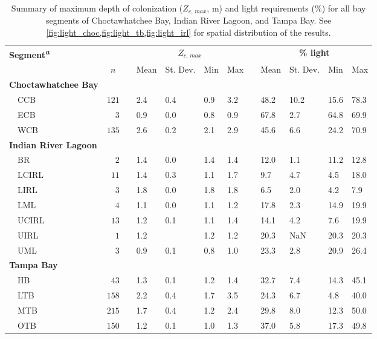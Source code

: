 \documentclass[letterpaper,12pt,oneside]{article}\usepackage[]{graphicx}\usepackage[]{color}
\begin{document}
\begin{table}[!tbp]
{\small
\caption{Summary of maximum depth of colonization ($Z_{c,\,max}$, m) and light requirements (\%) for all bay segments of Choctawhatchee Bay, Indian River Lagoon, and Tampa Bay.  See \cref{fig:light_choc,fig:light_tb,fig:light_irl} for spatial distribution of the results.\label{tab:light_summ}} 
\begin{center}
\begin{tabular}{lrcllllcllll}
\hline\hline
\multicolumn{1}{l}{\bfseries Segment\textsuperscript{\textit{a}}}&\multicolumn{1}{c}{\bfseries }&\multicolumn{1}{c}{\bfseries }&\multicolumn{4}{c}{\bfseries {\bf $Z_{c,\,max}$}}&\multicolumn{1}{c}{\bfseries }&\multicolumn{4}{c}{\bfseries \% light}\tabularnewline
\cline{4-7} \cline{9-12}
\multicolumn{1}{l}{}&\multicolumn{1}{c}{$n$}&\multicolumn{1}{c}{}&\multicolumn{1}{c}{Mean}&\multicolumn{1}{c}{St. Dev.}&\multicolumn{1}{c}{Min}&\multicolumn{1}{c}{Max}&\multicolumn{1}{c}{}&\multicolumn{1}{c}{Mean}&\multicolumn{1}{c}{St. Dev.}&\multicolumn{1}{c}{Min}&\multicolumn{1}{c}{Max}\tabularnewline
\hline
{\bfseries Choctawhatchee Bay}&&&&&&&&&&&\tabularnewline
~~CCB&$121$&&2.4&0.4&0.9&3.2&&48.2&10.2&15.6&78.3\tabularnewline
~~ECB&$  3$&&0.9&0.0&0.8&0.9&&67.8& 2.7&64.8&69.9\tabularnewline
~~WCB&$135$&&2.6&0.2&2.1&2.9&&45.6& 6.6&24.2&70.9\tabularnewline
\hline
{\bfseries Indian River Lagoon}&&&&&&&&&&&\tabularnewline
~~BR&$  2$&&1.4&0.0&1.4&1.4&&12.0& 1.1&11.2&12.8\tabularnewline
~~LCIRL&$ 11$&&1.4&0.3&1.1&1.7&& 9.7& 4.7& 4.5&18.0\tabularnewline
~~LIRL&$  3$&&1.8&0.0&1.8&1.8&& 6.5& 2.0& 4.2& 7.9\tabularnewline
~~LML&$  4$&&1.1&0.0&1.1&1.2&&17.8& 2.3&14.9&19.9\tabularnewline
~~UCIRL&$ 13$&&1.2&0.1&1.1&1.4&&14.1& 4.2& 7.6&19.9\tabularnewline
~~UIRL&$  1$&&1.2& &1.2&1.2&&20.3& NaN&20.3&20.3\tabularnewline
~~UML&$  3$&&0.9&0.1&0.8&1.0&&23.3& 2.8&20.9&26.4\tabularnewline
\hline
{\bfseries Tampa Bay}&&&&&&&&&&&\tabularnewline
~~HB&$ 43$&&1.3&0.1&1.2&1.4&&32.7& 7.4&14.3&45.1\tabularnewline
~~LTB&$158$&&2.2&0.4&1.7&3.5&&24.3& 6.7& 4.8&40.0\tabularnewline
~~MTB&$215$&&1.7&0.4&1.2&2.4&&29.8& 8.0&12.3&50.0\tabularnewline
~~OTB&$150$&&1.2&0.1&1.0&1.3&&37.0& 5.8&17.3&49.8\tabularnewline
\hline
\end{tabular}\end{center}}


\end{table}
\end{document}
